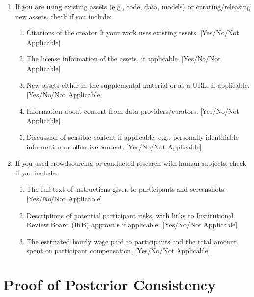 \documentclass[twoside]{article}
\theoremstyle{plain}
\theoremstyle{definition}
\theoremstyle{remark}
\begin{document}
\begin{enumerate}
  \item If you are using existing assets (e.g., code, data, models) or curating/releasing new assets, check if you include:
  \begin{enumerate}
    \item Citations of the creator If your work uses existing assets. [Yes/No/Not Applicable]
    \item The license information of the assets, if applicable. [Yes/No/Not Applicable]
    \item New assets either in the supplemental material or as a URL, if applicable. [Yes/No/Not Applicable]
    \item Information about consent from data providers/curators. [Yes/No/Not Applicable]
    \item Discussion of sensible content if applicable, e.g., personally identifiable information or offensive content. [Yes/No/Not Applicable]
  \end{enumerate}

  \item If you used crowdsourcing or conducted research with human subjects, check if you include:
  \begin{enumerate}
    \item The full text of instructions given to participants and screenshots. [Yes/No/Not Applicable]
    \item Descriptions of potential participant risks, with links to Institutional Review Board (IRB) approvals if applicable. [Yes/No/Not Applicable]
    \item The estimated hourly wage paid to participants and the total amount spent on participant compensation. [Yes/No/Not Applicable]
  \end{enumerate}

\end{enumerate}

\clearpage
\appendix
\thispagestyle{empty}

\onecolumn
{}

\section{Proof of Posterior Consistency}
\label{appx:consistency}
\end{document}
